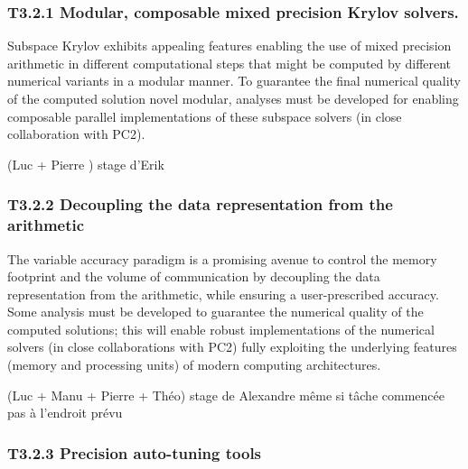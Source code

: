  \subsubsection{ 
 T3.2.1 Modular, composable mixed precision Krylov solvers. 
 }
  Subspace Krylov exhibits appealing
features enabling the use of mixed precision arithmetic in different computational steps that might be
computed by different numerical variants in a modular manner. To guarantee the final numerical
quality of the computed solution novel modular, analyses must be developed for enabling composable
parallel implementations of these subspace solvers (in close collaboration with PC2).

(Luc + Pierre ) stage d'Erik 

 \subsubsection{ T3.2.2 Decoupling the data representation from the arithmetic}

The variable accuracy paradigm is a promising avenue to control the memory footprint and the
volume of communication by decoupling the data representation from the arithmetic, while ensuring a
user-prescribed accuracy. Some analysis must be developed to guarantee the numerical quality of the
computed solutions; this will enable robust implementations of the numerical solvers (in close
collaborations with PC2) fully exploiting the underlying features (memory and processing units) of
modern computing architectures. 

(Luc + Manu + Pierre + Théo) stage de Alexandre même si tâche commencée pas à l'endroit prévu 


\subsubsection{ 
T3.2.3 Precision auto-tuning tools
} 

